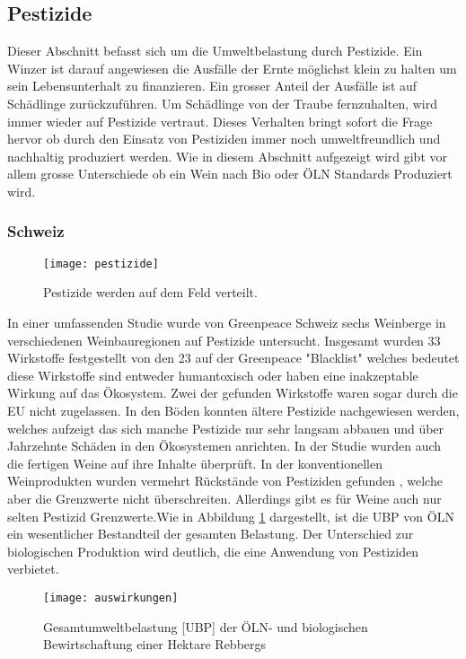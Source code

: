 \subsection{Pestizide}
Dieser Abschnitt befasst sich um die Umweltbelastung durch Pestizide. Ein Winzer ist darauf angewiesen die Ausfälle der Ernte möglichst klein zu halten um sein Lebensunterhalt zu finanzieren. Ein grosser Anteil der Ausfälle ist auf Schädlinge zurückzuführen. Um Schädlinge von der Traube fernzuhalten, wird immer wieder auf Pestizide vertraut. Dieses Verhalten bringt sofort die Frage hervor ob durch den Einsatz von Pestiziden immer noch umweltfreundlich und nachhaltig produziert werden. Wie in diesem Abschnitt aufgezeigt wird gibt vor allem grosse Unterschiede ob ein Wein nach Bio oder ÖLN Standards Produziert wird.
\subsubsection{Schweiz}
\begin{wrapfigure}{r}{10cm}
	\texttt{[image: pestizide]}
	\caption{Pestizide werden auf dem Feld verteilt.}
\end{wrapfigure}
In einer umfassenden Studie wurde von Greenpeace Schweiz sechs Weinberge in verschiedenen Weinbauregionen auf Pestizide untersucht. Insgesamt wurden 33 Wirkstoffe festgestellt von den 23 auf der Greenpeace "Blacklist" welches bedeutet diese Wirkstoffe sind entweder humantoxisch oder haben eine inakzeptable Wirkung auf das Ökosystem. Zwei der gefunden Wirkstoffe waren sogar durch die EU nicht zugelassen. In den Böden konnten ältere Pestizide nachgewiesen werden, welches aufzeigt das sich manche Pestizide nur sehr langsam abbauen und über Jahrzehnte Schäden in den Ökosystemen anrichten. In der Studie wurden auch die fertigen Weine auf ihre Inhalte überprüft. In der konventionellen Weinprodukten wurden vermehrt Rückstände von Pestiziden gefunden , welche aber die Grenzwerte nicht überschreiten. Allerdings gibt es für Weine auch nur selten Pestizid Grenzwerte.Wie in Abbildung \ref{fig:ha} dargestellt, ist die UBP von ÖLN ein wesentlicher Bestandteil der gesamten Belastung. Der Unterschied zur biologischen Produktion wird deutlich, die eine Anwendung von Pestiziden verbietet.
 \begin{figure}[H]	
	\centering
	\texttt{[image: auswirkungen]}
	\caption{Gesamtumweltbelastung [UBP] der ÖLN- und biologischen Bewirtschaftung einer Hektare Rebbergs}
	\label{fig:ha}
\end{figure}


